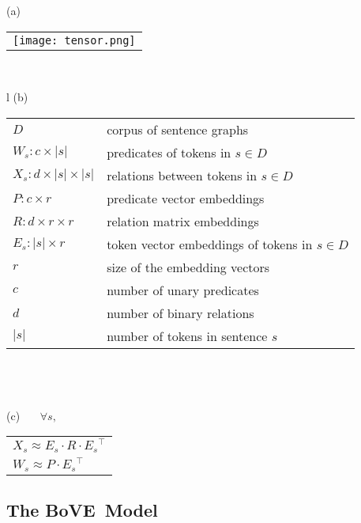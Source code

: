\documentclass[11pt,a4paper]{article}
\newcommand{\trans}{{}^{\top}}
\newcommand{\by}{{\times}}
\newcommand{\bove}{Bo{\nolinebreak\hspace{-0.25ex}}VE}
\begin{document}
\begin{figure*}[tb]
  (a)
  \begin{tabular}{l}
    \texttt{[image: tensor.png]}
  \end{tabular}
  ~~~~
  \begin{tabular}{l}
    (b)
  \begin{tabular}{ll}
    \(D\) 
    & corpus of sentence graphs
    \\
    \(W_{s}: c\by {|s|}\) 
    & predicates of tokens in $s{\in}D$
    \\
    \(X_{s}: d\by {|s|}\by {|s|}\)
    & relations between tokens in $s{\in}D$
    \\[1ex]
    \(P: c\by r\) 
    & predicate vector embeddings
    \\
    \(R: d\by r\by r\) 
    & relation matrix embeddings
    \\
    \(E_{s}: {|s|}\by r\) 
    & token vector embeddings of tokens in $s{\in}D$
    \\[1ex]
    $r$ & size of the embedding vectors \\
    $c$ & number of unary predicates  \\
    $d$ & number of binary relations  \\
    $|s|$ & number of tokens in sentence $s$
  \end{tabular} 
  \\ ~ \\ ~ \\
  (c) ~~~\(\displaystyle \forall s, \)
  \begin{tabular}{l}
    \(\displaystyle X_s \approx E_s \cdot R \cdot E_s\!\trans \)
    \\
    \(\displaystyle W_s \approx P \cdot E_s\!\trans \)
    \\ %
  \end{tabular}
  \end{tabular}
  \caption{(a) A depiction of the tensor decomposition model, 
    with the plate
    indicating one such pair per sentence in the data, with $R$ and $P$ shared
    across sentences.  (b) The symbols used in the definition of the model.  
    (c) The tensor decomposition in equations.}
  \label{fig:tensor}
\end{figure*}


\subsection{The \bove\ Model}
\end{document}
